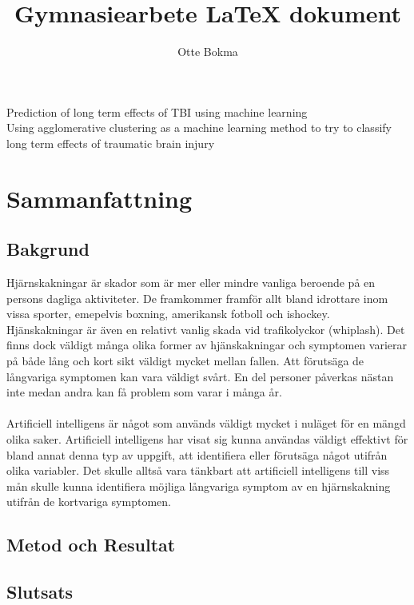 \documentclass[11pt]{article}
\title{Gymnasiearbete {\LaTeX} dokument}
\author{Otte Bokma}
\begin{document}
\begin{titlepage}

  \begin{center}
    \huge{Prediction of long term effects of TBI using machine learning}
    \\[1cm]
    \large{Using agglomerative clustering as a machine learning method to try to classify long term effects of traumatic brain injury}
  \end{center}
\end{titlepage}

\section*{Sammanfattning}

\subsection*{Bakgrund}

Hjärnskakningar är skador som är mer eller mindre vanliga beroende på en persons dagliga aktiviteter. De framkommer framför allt bland idrottare inom vissa sporter, emepelvis boxning, amerikansk fotboll och ishockey. Hjänskakningar är även en relativt vanlig skada vid trafikolyckor (whiplash). Det finns dock väldigt många olika former av hjänskakningar och symptomen varierar på både lång och kort sikt väldigt mycket mellan fallen. Att förutsäga de långvariga symptomen kan vara väldigt svårt. En del personer påverkas nästan inte medan andra kan få problem som varar i många år.\\
\\
Artificiell intelligens är något som används väldigt mycket i nuläget för en mängd olika saker. Artificiell intelligens har visat sig kunna användas väldigt effektivt för bland annat denna typ av uppgift, att identifiera eller förutsäga något utifrån olika variabler. Det skulle alltså vara tänkbart att artificiell intelligens till viss mån skulle kunna identifiera möjliga långvariga symptom av en hjärnskakning utifrån de kortvariga symptomen.

\subsection*{Metod och Resultat}

\subsection*{Slutsats}
\end{document}
